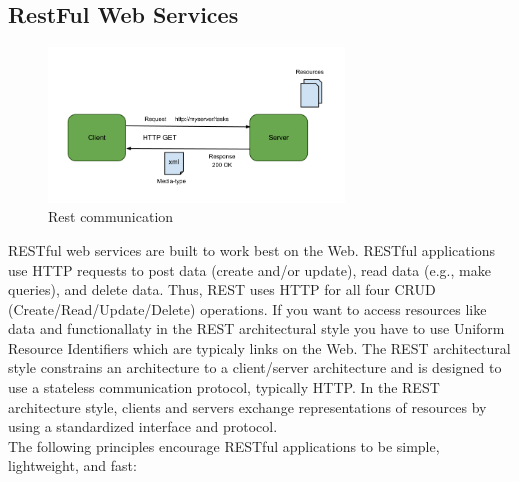\documentclass[12pt]{article}
\begin{document}
\subsection{RestFul Web Services}
\begin{figure}[here!]
	\centering
	\includegraphics[width=0.7\textwidth]{images/REST}
	\caption{Rest communication \cite{vogtbild1}}
    \label{fig:restcomm}
	\end{figure}
	\FloatBarrier \noindent
RESTful web services are built to work best on the Web. RESTful applications use HTTP requests to post data (create and/or update), read data (e.g., make queries), and delete data. Thus, REST uses HTTP for all four CRUD (Create/Read/Update/Delete) operations. If you want to access resources like data and functionallaty in the REST architectural style you have to use Uniform Resource Identifiers which are typicaly links 
on the Web. The REST architectural style constrains an architecture to a client/server architecture and is designed to use a stateless communication protocol, typically HTTP. In the REST architecture style, clients and servers exchange representations of resources by using a standardized interface and protocol. \\
The following principles encourage RESTful applications to be simple, lightweight, and fast:
\\
\end{document}
